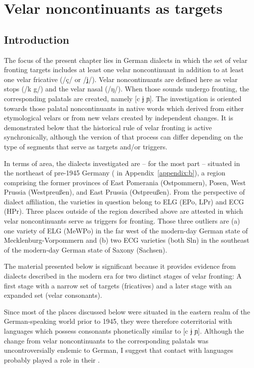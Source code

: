 \chapter{Velar noncontinuants as targets}\label{sec:11}

\section{Introduction}\label{sec:11.1}

The focus of the present chapter lies in German dialects in which the set of velar fronting targets includes at least one velar noncontinuant in addition to at least one velar fricative (/ç/ or /ʝ/). Velar noncontinuants are defined here as velar stops (/k g/) and the velar nasal (/ŋ/). When those sounds undergo fronting, the corresponding palatals are created, namely [c ɉ ɲ]. The investigation is oriented towards those palatal noncontinuants in native words which derived from either etymological velars or from new velars created by independent changes. It is demonstrated below that the historical rule of velar fronting is active synchronically, although the version of that process can differ depending on the type of segments that serve as targets and/or triggers.

In terms of area, the dialects investigated are -- for the most part -- situated in the northeast of pre-1945 Germany ( in Appendix~\ref{appendix:b}), a region comprising the former provinces of East Pomerania (Ostpommern), Posen, West Prussia (Westpreußen), and East Prussia (Ostpreußen). From the perspective of dialect affiliation, the varieties in question belong to ELG (EPo, LPr) and ECG (HPr). Three places outside of the region described above are attested in which velar noncontinuants serve as triggers for fronting. Those three outliers are (a) one variety of ELG (MeWPo) in the far west of the modern-day German state of Mecklenburg-Vorpommern and (b) two ECG varieties (both Sln) in the southeast of the modern-day German state of Saxony (Sachsen).

The material presented below is significant because it provides evidence from dialects described in the modern era for two distinct stages of velar fronting: A first stage with a narrow set of targets (fricatives) and a later stage with an expanded set (velar consonants).

Since most of the places discussed below were situated in the eastern realm of the German-speaking world prior to 1945, they were therefore coterritorial with  languages which possess consonants phonetically similar to [c ɉ ɲ]. Although the change from velar noncontinuants to the corresponding palatals was uncontroversially endemic to German, I suggest that contact with  languages probably played a role in their .

